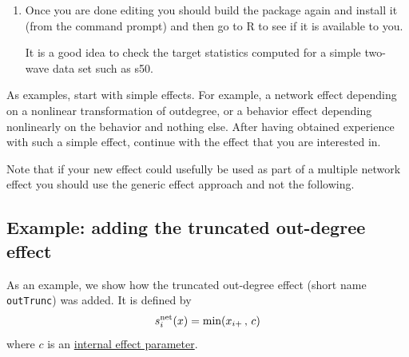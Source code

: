 \documentclass[a4paper,fleqn,11pt]{article}
\newcommand{\+}{\, + \,}
\newcommand{\sfn}[1]{\textsf{#1}}
\begin{document}
{\begin{enumerate}
		\item Once you are done editing you should build
the package again and install it (from the command prompt)
and then go to R to see if it is available to you.

It is a good idea to check the target statistics computed for a simple
two-wave data set such as \sfn{s50}.
\end{enumerate}

As examples, start with simple effects.
For example, a network effect depending on a nonlinear transformation
of outdegree, or a behavior effect depending nonlinearly
on the behavior and nothing else.
After having obtained experience with such a simple effect,
continue with the effect that you are interested in.

Note that if your new effect could usefully be used as part of a multiple
network effect you should use the generic effect approach and not the following.


\subsection{Example: adding the truncated out-degree effect}

As an example, we show how the truncated out-degree effect
(short name \texttt{outTrunc}) was added. It is
 defined by
 \begin{equation}
  s^{\rm net}_{i}(x) = \text{min}(x_{i+}\,,\, c)   \label{outTrunc}
 \end{equation}
where $c$ is an \hyperlink{T_effpar}{internal effect parameter}.

}
\end{document}
